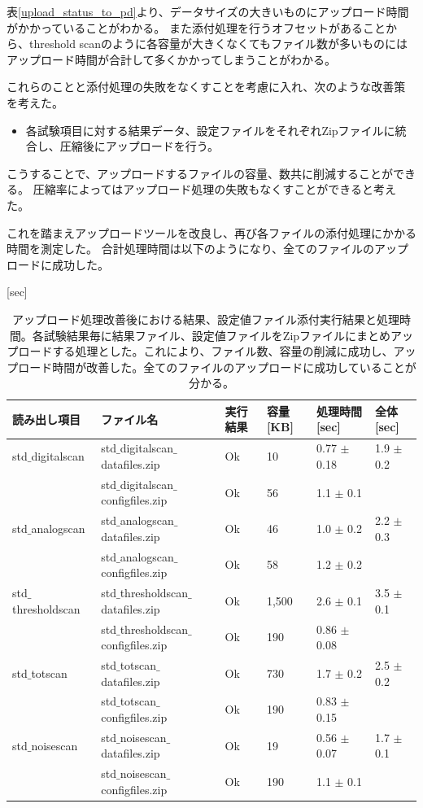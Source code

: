 \newpage
表\ref{upload_status_to_pd}より、データサイズの大きいものにアップロード時間がかかっていることがわかる。
また添付処理を行うオフセットがあることから、threshold scanのように各容量が大きくなくてもファイル数が多いものにはアップロード時間が合計して多くかかってしまうことがわかる。

これらのことと添付処理の失敗をなくすことを考慮に入れ、次のような改善策を考えた。

\begin{itemize}
  \item 各試験項目に対する結果データ、設定ファイルをそれぞれZipファイルに統合し、圧縮後にアップロードを行う。
\end{itemize}

こうすることで、アップロードするファイルの容量、数共に削減することができる。
圧縮率によってはアップロード処理の失敗もなくすことができると考えた。

これを踏まえアップロードツールを改良し、再び各ファイルの添付処理にかかる時間を測定した。
合計処理時間は以下のようになり、全てのファイルのアップロードに成功した。

  [{\rm sec}]
\eee

\begin{longtable}{|llllll|}
  \caption[アップロード処理改善後における結果、設定値ファイル添付実行結果と処理時間]{アップロード処理改善後における結果、設定値ファイル添付実行結果と処理時間。各試験結果毎に結果ファイル、設定値ファイルをZipファイルにまとめアップロードする処理とした。これにより、ファイル数、容量の削減に成功し、アップロード時間が改善した。全てのファイルのアップロードに成功していることが分かる。}
  \label{upload_status_to_pd_zip}
  \endhead
  \hline
  読み出し項目 & ファイル名 & 実行結果 & 容量[KB] & 処理時間[sec] & 全体[sec] \\ 
  \hline
 std$\_$digitalscan & std$\_$digitalscan$\_$datafiles.zip & Ok & 10 & 0.77 $\pm$ 0.18 & 1.9 $\pm$ 0.2\\
 & std$\_$digitalscan$\_$configfiles.zip & Ok & 56 & 1.1 $\pm$ 0.1 &\\
\hline
 std$\_$analogscan & std$\_$analogscan$\_$datafiles.zip & Ok & 46 & 1.0 $\pm$ 0.2 & 2.2 $\pm$ 0.3 \\
 & std$\_$analogscan$\_$configfiles.zip & Ok & 58 & 1.2 $\pm$ 0.2 &\\
\hline
 std$\_$thresholdscan & std$\_$thresholdscan$\_$datafiles.zip & Ok & 1,500 & 2.6 $\pm$ 0.1 & 3.5 $\pm$ 0.1 \\
 & std$\_$thresholdscan$\_$configfiles.zip & Ok & 190 & 0.86 $\pm$ 0.08 &\\
\hline
 std$\_$totscan & std$\_$totscan$\_$datafiles.zip & Ok & 730 & 1.7 $\pm$ 0.2 & 2.5 $\pm$ 0.2\\
 & std$\_$totscan$\_$configfiles.zip & Ok & 190 & 0.83 $\pm$ 0.15 &\\
\hline
 std$\_$noisescan & std$\_$noisescan$\_$datafiles.zip & Ok & 19 & 0.56 $\pm$ 0.07 & 1.7 $\pm$ 0.1 \\
 & std$\_$noisescan$\_$configfiles.zip & Ok & 190 & 1.1 $\pm$ 0.1 &\\
\hline
\end{longtable}

